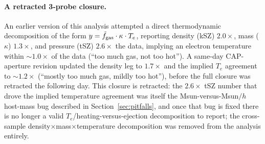\documentclass[11pt]{article}
\newcommand{\fgt}{\tilde{f}_{\rm gas}}          %
\begin{document}
\paragraph{A retracted 3-probe closure.} An earlier version of this analysis
attempted a direct thermodynamic decomposition of the form
$y=\fgt\cdot\kappa\cdot T_e$, reporting density (kSZ) $2.0\times$, mass
($\kappa$) $1.3\times$, and pressure (tSZ) $2.6\times$ the data, implying an
electron temperature within $\sim1.0\times$ of the data (``too much gas, not
too hot''). A same-day CAP-aperture revision updated the density leg to
$1.7\times$ and the implied $T_e$ agreement to $\sim1.2\times$ (``mostly too
much gas, mildly too hot''), before the full closure was retracted the
following day. %
This closure is retracted: the $2.6\times$ tSZ number that drove the implied
temperature agreement was itself the Msun-versus-Msun$/h$ host-mass bug
described in Section~\ref{sec:pitfalls}, and once that bug is fixed there is no
longer a valid $T_e$/heating-versus-ejection decomposition to report; the
cross-sample density$\times$mass$\times$temperature decomposition was removed
from the analysis entirely. %
\end{document}
